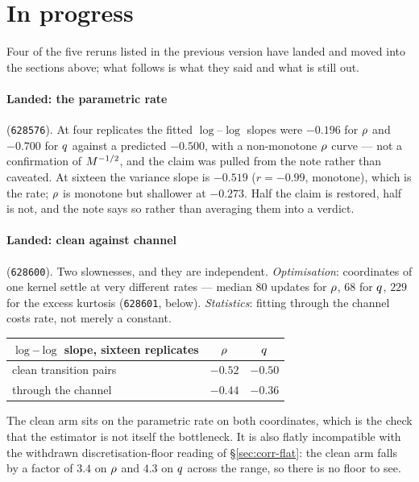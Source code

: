 \section{In progress}
\label{sec:pending}

Four of the five reruns listed in the previous version have landed and moved into the sections
above; what follows is what they said and what is still out.

\paragraph{Landed: the parametric rate} (\texttt{628576}). At four replicates the fitted
$\log$--$\log$ slopes were $-0.196$ for $\rho$ and $-0.700$ for $q$ against a predicted
$-0.500$, with a non-monotone $\rho$ curve --- not a confirmation of $M^{-1/2}$, and the
claim was pulled from the note rather than caveated. At sixteen the variance slope is $-0.519$
($r=-0.99$, monotone), which is the rate; $\rho$ is monotone but shallower at $-0.273$. Half the
claim is restored, half is not, and the note says so rather than averaging them into a verdict.

\paragraph{Landed: clean against channel} (\texttt{628600}). Two slownesses, and they are
independent. \emph{Optimisation}: coordinates of one kernel settle at very different rates ---
median $80$ updates for $\rho$, $68$ for $q$, $229$ for the excess kurtosis
(\texttt{628601}, below). \emph{Statistics}: fitting through the channel costs rate, not merely a
constant.

\begin{center}\small
\begin{tabular}{@{}lcc@{}}
\toprule
$\log$--$\log$ slope, sixteen replicates & $\rho$ & $q$ \\
\midrule
clean transition pairs & $-0.52$ & $-0.50$ \\
through the channel    & $-0.44$ & $-0.36$ \\
\bottomrule
\end{tabular}
\end{center}

\noindent
The clean arm sits on the parametric rate on both coordinates, which is the check that the
estimator is not itself the bottleneck. It is also flatly incompatible with the withdrawn
discretisation-floor reading of \S\ref{sec:corr-flat}: the clean arm falls by a factor of $3.4$ on
$\rho$ and $4.3$ on $q$ across the range, so there is no floor to see.

